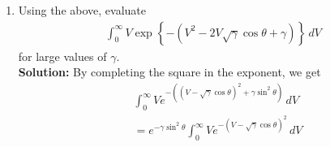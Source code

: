 \documentclass[journal,10pt,twocolumn]{IEEEtran}
\providecommand{\sbrak}[1]{\ensuremath{{}\left[#1\right]}}
\providecommand{\brak}[1]{\ensuremath{\left(#1\right)}}
\providecommand{\cbrak}[1]{\ensuremath{\left\{#1\right\}}}
\newcommand{\solution}{\noindent \textbf{Solution: }}
\begin{document}
\begin{enumerate}
\begin{enumerate}[label=(\alph{enumii})]
%
\begin{align}
\label{eq:v_minus_alpha_integ}
\lim_{\alpha \rightarrow \infty}\int_{0}^{\infty}\brak{V-\alpha }e^{-\brak{V-\alpha}^2 }\,dV
&= 0
\\
\label{eq:no_v_minus_alpha_integ}
\lim_{\alpha \rightarrow \infty}\int_{0}^{\infty} e^{-\brak{V-\alpha}^2 }\,dV
&=  \sqrt{\pi}
\end{align}\\
\solution For \eqref{eq:v_minus_alpha_integ}, let $(V-\alpha)^2 = t$. Then
\begin{equation*}
	2(V-\alpha)dV = dt
\end{equation*} 
Changing the integral in terms of $t$,
\begin{align*}
	\lim_{\alpha \rightarrow \infty}\frac{1}{2}\int_{-\alpha^2}^{\infty}e^{-t}\,dt &= \lim_{\alpha \rightarrow \infty}\frac{1}{2}\sbrak{-e^{-t}}_{\alpha^2}^{\infty}\\
	&= \lim_{\alpha \rightarrow \infty}\frac{1}{2}e^{-\alpha^2}\\
	&= 0
\end{align*}
For \eqref{eq:no_v_minus_alpha_integ}, let $\brak{V-\alpha} = \frac{k}{\sqrt{2}}$. Then
\begin{equation*}
	dV = \frac{dk}{\sqrt{2}} 
\end{equation*} 
Changing the integral in terms of $k$,
\begin{align*}
	\lim_{\alpha \rightarrow \infty}\frac{1}{\sqrt{2}}\int_{-\sqrt{2}\alpha}^{\infty} e^{-\frac{k^2}{2}}\,dk &= \sqrt{\pi}\lim_{\alpha \rightarrow \infty}\frac{1}{\sqrt{2\pi}}\int_{-\sqrt{2}\alpha}^{\infty} e^{-\frac{k^2}{2}}\,dk\\
	&= \sqrt{\pi}\frac{1}{\sqrt{2\pi}}\int_{-\infty}^{\infty} e^{-\frac{k^2}{2}}\,dk\\
	&= \sqrt{\pi}
\end{align*}
%
\item 
Using the above, evaluate
%
\begin{align}
\int_{0}^{\infty}V\exp\cbrak{-\brak{V^2 - 2V \sqrt{\gamma}\cos \theta +\gamma}}\,dV
\end{align}
%
for large values of $\gamma$.\\
\solution By completing the square in the exponent, we get
\begin{align*}
	&\int_{0}^{\infty}Ve^{-\brak{(V - \sqrt{\gamma}\cos \theta)^2 +\gamma\sin^2 \theta}}\,dV\\
	&=e^{-\gamma\sin^2 \theta}\int_{0}^{\infty}Ve^{-\brak{V - \sqrt{\gamma}\cos \theta}^2}\,dV\\

\end{align*}
\end{enumerate}
\end{enumerate}
\end{document}
